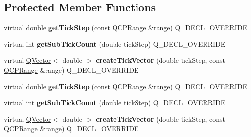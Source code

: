 \subsection*{Protected Member Functions}
\begin{DoxyCompactItemize}
\item 
\mbox{\label{class_q_c_p_axis_ticker_log_a57be974214a065d3247406331f02fa49}} 
virtual double {\bfseries get\+Tick\+Step} (const \hyperlink{class_q_c_p_range}{Q\+C\+P\+Range} \&range) Q\+\_\+\+D\+E\+C\+L\+\_\+\+O\+V\+E\+R\+R\+I\+DE
\item 
\mbox{\label{class_q_c_p_axis_ticker_log_a352fef7ae68837acd26e35188aa86167}} 
virtual int {\bfseries get\+Sub\+Tick\+Count} (double tick\+Step) Q\+\_\+\+D\+E\+C\+L\+\_\+\+O\+V\+E\+R\+R\+I\+DE
\item 
\mbox{\label{class_q_c_p_axis_ticker_log_af8873a8d1d2b9392d8f7a73218c889ab}} 
virtual \hyperlink{class_q_vector}{Q\+Vector}$<$ double $>$ {\bfseries create\+Tick\+Vector} (double tick\+Step, const \hyperlink{class_q_c_p_range}{Q\+C\+P\+Range} \&range) Q\+\_\+\+D\+E\+C\+L\+\_\+\+O\+V\+E\+R\+R\+I\+DE
\item 
\mbox{\label{class_q_c_p_axis_ticker_log_af2c27089792fe459395c108ac6721dc7}} 
virtual double {\bfseries get\+Tick\+Step} (const \hyperlink{class_q_c_p_range}{Q\+C\+P\+Range} \&range) Q\+\_\+\+D\+E\+C\+L\+\_\+\+O\+V\+E\+R\+R\+I\+DE
\item 
\mbox{\label{class_q_c_p_axis_ticker_log_aca64621d1a341538bc1afe67e90d85f7}} 
virtual int {\bfseries get\+Sub\+Tick\+Count} (double tick\+Step) Q\+\_\+\+D\+E\+C\+L\+\_\+\+O\+V\+E\+R\+R\+I\+DE
\item 
\mbox{\label{class_q_c_p_axis_ticker_log_a4d5b72e61eeac27c584eec487f62a52e}} 
virtual \hyperlink{class_q_vector}{Q\+Vector}$<$ double $>$ {\bfseries create\+Tick\+Vector} (double tick\+Step, const \hyperlink{class_q_c_p_range}{Q\+C\+P\+Range} \&range) Q\+\_\+\+D\+E\+C\+L\+\_\+\+O\+V\+E\+R\+R\+I\+DE
\end{DoxyCompactItemize}
